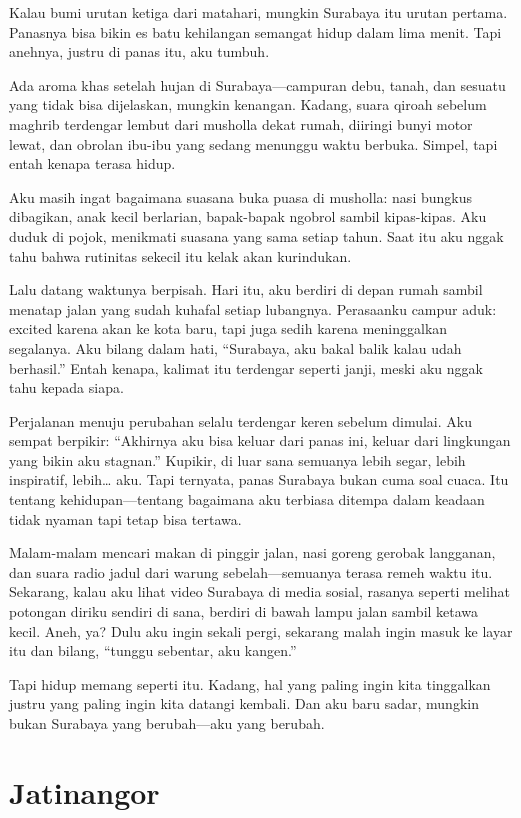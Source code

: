 \documentclass[
  letterpaper,
  DIV=11,
  numbers=noendperiod]{scrreprt}
\begin{document}
Kalau bumi urutan ketiga dari matahari, mungkin Surabaya itu urutan
pertama. Panasnya bisa bikin es batu kehilangan semangat hidup dalam
lima menit. Tapi anehnya, justru di panas itu, aku tumbuh.

Ada aroma khas setelah hujan di Surabaya---campuran debu, tanah, dan
sesuatu yang tidak bisa dijelaskan, mungkin kenangan. Kadang, suara
qiroah sebelum maghrib terdengar lembut dari musholla dekat rumah,
diiringi bunyi motor lewat, dan obrolan ibu-ibu yang sedang menunggu
waktu berbuka. Simpel, tapi entah kenapa terasa hidup.

Aku masih ingat bagaimana suasana buka puasa di musholla: nasi bungkus
dibagikan, anak kecil berlarian, bapak-bapak ngobrol sambil kipas-kipas.
Aku duduk di pojok, menikmati suasana yang sama setiap tahun. Saat itu
aku nggak tahu bahwa rutinitas sekecil itu kelak akan kurindukan.

Lalu datang waktunya berpisah. Hari itu, aku berdiri di depan rumah
sambil menatap jalan yang sudah kuhafal setiap lubangnya. Perasaanku
campur aduk: excited karena akan ke kota baru, tapi juga sedih karena
meninggalkan segalanya. Aku bilang dalam hati, ``Surabaya, aku bakal
balik kalau udah berhasil.'' Entah kenapa, kalimat itu terdengar seperti
janji, meski aku nggak tahu kepada siapa.

Perjalanan menuju perubahan selalu terdengar keren sebelum dimulai. Aku
sempat berpikir: ``Akhirnya aku bisa keluar dari panas ini, keluar dari
lingkungan yang bikin aku stagnan.'' Kupikir, di luar sana semuanya
lebih segar, lebih inspiratif, lebih\ldots{} aku. Tapi ternyata, panas
Surabaya bukan cuma soal cuaca. Itu tentang kehidupan---tentang
bagaimana aku terbiasa ditempa dalam keadaan tidak nyaman tapi tetap
bisa tertawa.

Malam-malam mencari makan di pinggir jalan, nasi goreng gerobak
langganan, dan suara radio jadul dari warung sebelah---semuanya terasa
remeh waktu itu. Sekarang, kalau aku lihat video Surabaya di media
sosial, rasanya seperti melihat potongan diriku sendiri di sana, berdiri
di bawah lampu jalan sambil ketawa kecil. Aneh, ya? Dulu aku ingin
sekali pergi, sekarang malah ingin masuk ke layar itu dan bilang,
``tunggu sebentar, aku kangen.''

Tapi hidup memang seperti itu. Kadang, hal yang paling ingin kita
tinggalkan justru yang paling ingin kita datangi kembali. Dan aku baru
sadar, mungkin bukan Surabaya yang berubah---aku yang berubah.

\section{Jatinangor}\label{jatinangor}
\end{document}
